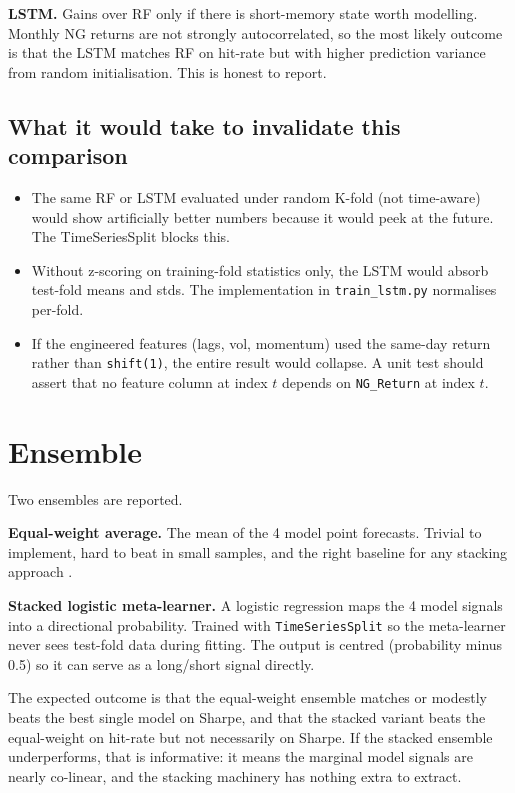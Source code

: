 \documentclass[11pt,letterpaper]{article}
\begin{document}
\textbf{LSTM.} Gains over RF only if there is short-memory state worth modelling. Monthly NG returns are not strongly autocorrelated, so the most likely outcome is that the LSTM matches RF on hit-rate but with higher prediction variance from random initialisation. This is honest to report.

\subsection{What it would take to invalidate this comparison}

\begin{itemize}[leftmargin=*,nosep]
  \item The same RF or LSTM evaluated under random K-fold (not time-aware) would show artificially better numbers because it would peek at the future. The TimeSeriesSplit blocks this.
  \item Without z-scoring on training-fold statistics only, the LSTM would absorb test-fold means and stds. The implementation in \texttt{train\_lstm.py} normalises per-fold.
  \item If the engineered features (lags, vol, momentum) used the same-day return rather than \texttt{shift(1)}, the entire result would collapse. A unit test should assert that no feature column at index $t$ depends on \texttt{NG\_Return} at index $t$.
\end{itemize}

\section{Ensemble}

Two ensembles are reported.

\textbf{Equal-weight average.} The mean of the 4 model point forecasts. Trivial to implement, hard to beat in small samples, and the right baseline for any stacking approach \parencite{gu2020empirical}.

\textbf{Stacked logistic meta-learner.} A logistic regression maps the 4 model signals into a directional probability. Trained with \texttt{TimeSeriesSplit} so the meta-learner never sees test-fold data during fitting. The output is centred (probability minus 0.5) so it can serve as a long/short signal directly.

The expected outcome is that the equal-weight ensemble matches or modestly beats the best single model on Sharpe, and that the stacked variant beats the equal-weight on hit-rate but not necessarily on Sharpe. If the stacked ensemble underperforms, that is informative: it means the marginal model signals are nearly co-linear, and the stacking machinery has nothing extra to extract.
\end{document}
